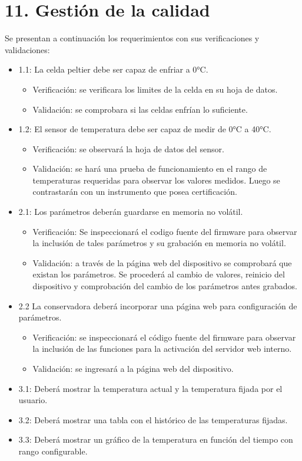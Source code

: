 \section{11. Gestión de la calidad}
\label{sec:calidad}


Se presentan a continuación los requerimientos con sus verificaciones y validaciones:

\begin{itemize}
    \item 1.1: La celda peltier debe ser capaz de enfriar a 0°C.
    \begin{itemize}
        \item Verificación: se verificara los limites de la celda en su hoja de datos.
        \item Validación: se comprobara si las celdas enfrían lo suficiente.
    \end{itemize}
    \item 1.2: El sensor de temperatura debe ser capaz de medir de 0°C a 40°C.
    \begin{itemize}
        \item Verificación: se observará la hoja de datos del sensor.
        \item Validación: se hará una prueba de funcionamiento en el rango de temperaturas requeridas para observar los valores medidos. Luego se contrastarán con un instrumento que posea certificación.
    \end{itemize}
    \item 2.1: Los parámetros deberán guardarse en memoria no volátil.
    \begin{itemize}
        \item Verificación: Se inspeccionará el codigo fuente del firmware para observar la inclusión de tales parámetros y su grabación en memoria no volátil.
        \item Validación: a través de la página web del dispositivo se comprobará que existan los parámetros. Se procederá al cambio de valores, reinicio del dispositivo y comprobación del cambio de los parámetros antes grabados.
    \end{itemize}
    \item 2.2 La conservadora deberá incorporar una página web para configuración de parámetros.
    \begin{itemize}
        \item Verificación: se inspeccionará el código fuente del firmware para observar la inclusión de las funciones para la activación del servidor web interno.
        \item Validación: se ingresará a la página web del dispositivo.
    \end{itemize}
    \item 3.1: Deberá mostrar la temperatura actual y la temperatura fijada por el usuario.
    \item 3.2: Deberá mostrar una tabla con el histórico de las temperaturas fijadas.
    \item 3.3: Deberá mostrar un gráfico de la temperatura en función del tiempo con rango configurable.
\end{itemize}